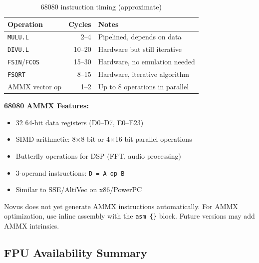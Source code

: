 \begin{table}[h]
\centering
\begin{tabular}{lrl}
\textbf{Operation} & \textbf{Cycles} & \textbf{Notes} \\
\hline
\texttt{MULU.L} & 2--4 & Pipelined, depends on data \\
\texttt{DIVU.L} & 10--20 & Hardware but still iterative \\
\texttt{FSIN}/\texttt{FCOS} & 15--30 & Hardware, no emulation needed \\
\texttt{FSQRT} & 8--15 & Hardware, iterative algorithm \\
AMMX vector op & 1--2 & Up to 8 operations in parallel \\
\end{tabular}
\caption{68080 instruction timing (approximate)}
\end{table}

\textbf{68080 AMMX Features:}
\begin{itemize}
\item 32 64-bit data registers (D0--D7, E0--E23)
\item SIMD arithmetic: 8$\times$8-bit or 4$\times$16-bit parallel operations
\item Butterfly operations for DSP (FFT, audio processing)
\item 3-operand instructions: \texttt{D = A op B}
\item Similar to SSE/AltiVec on x86/PowerPC
\end{itemize}

\begin{notebox}
Novus does not yet generate AMMX instructions automatically. For AMMX optimization, use inline assembly with the \texttt{asm \{\}} block. Future versions may add AMMX intrinsics.
\end{notebox}

\subsection{FPU Availability Summary}

